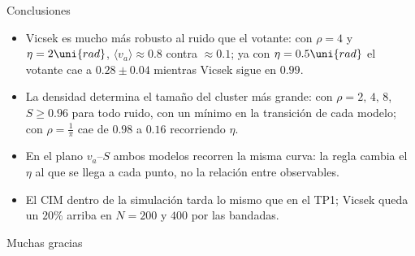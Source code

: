 \documentclass[aspectratio=169]{beamer}
\begin{document}
\begin{frame}{Conclusiones}
  \begin{itemize}
    \item Vicsek es mucho más robusto al ruido que el votante: con $\rho = 4$ y
      $\eta = 2\uni{rad}$, $\langle v_a \rangle \approx 0.8$ contra $\approx 0.1$;
      ya con $\eta = 0.5\uni{rad}$ el votante cae a $0.28 \pm 0.04$
      mientras Vicsek sigue en $0.99$.
    \item La densidad determina el tamaño del cluster más grande: con $\rho = 2,\,4,\,8$,
      $S \ge 0.96$ para todo ruido, con un mínimo en la transición de cada modelo;
      con $\rho = \frac{1}{\pi}$ cae de $0.98$ a $0.16$ recorriendo $\eta$.
    \item En el plano $v_a$--$S$ ambos modelos recorren la misma curva: la regla
      cambia el $\eta$ al que se llega a cada punto, no la relación entre observables.
    \item El CIM dentro de la simulación tarda lo mismo que en el TP1; Vicsek
      queda un $20\%$ arriba en $N = 200$ y $400$ por las bandadas.
  \end{itemize}
\end{frame}

\begin{frame}[plain]
  \centering
  \vfill
  {\Huge Muchas gracias}
  \vfill
\end{frame}
\end{document}
